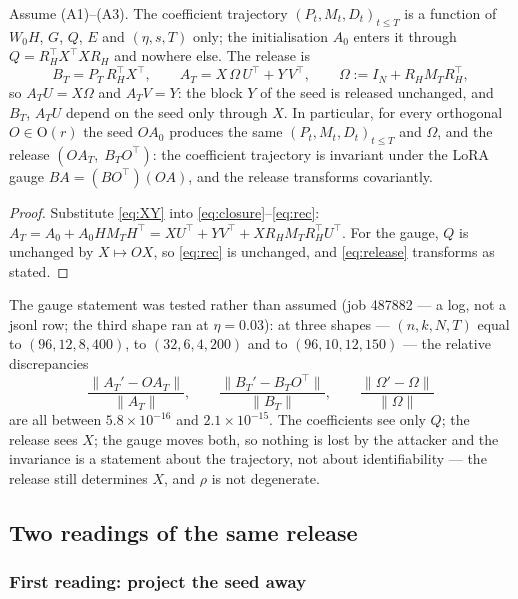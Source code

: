 \begin{corollary}\label{cor:seed}
Assume (A1)--(A3). The coefficient trajectory $(P_t,M_t,D_t)_{t\le T}$ is a
function of $W_0H$, $G$, $Q$, $E$ and $(\eta,s,T)$ only; the initialisation
$A_0$ enters it through $Q=R_H^{\!\top}X^{\!\top}XR_H$ and nowhere else. The release is
\begin{equation}\label{eq:release}
  B_T=P_T\,R_H^{\!\top}X^{\!\top},\qquad
  A_T=X\,\Omega\,U^{\!\top}+Y\,V^{\!\top},\qquad
  \Omega:=I_N+R_HM_TR_H^{\!\top},
\end{equation}
so $A_TU=X\Omega$ and $A_TV=Y$: the block $Y$ of the seed is released
unchanged, and $B_T$, $A_TU$ depend on the seed only through $X$. In
particular, for every orthogonal $O\in\mathrm O(r)$ the seed $OA_0$ produces
the same $(P_t,M_t,D_t)_{t\le T}$ and $\Omega$, and the release
$(OA_T,\;B_TO^{\!\top})$: the coefficient trajectory is invariant under the
LoRA gauge $BA=(BO^{\!\top})(OA)$, and the release transforms covariantly.
\end{corollary}
\begin{proof}
Substitute \eqref{eq:XY} into \eqref{eq:closure}--\eqref{eq:rec}:
$A_T=A_0+A_0HM_TH^{\!\top}=XU^{\!\top}+YV^{\!\top}+XR_HM_TR_H^{\!\top}U^{\!\top}$.
For the gauge, $Q$ is unchanged by $X\mapsto OX$, so \eqref{eq:rec} is
unchanged, and \eqref{eq:release} transforms as stated.
\end{proof}
The gauge statement was tested rather than assumed (job 487882 — a log,
not a jsonl row; the third shape ran at $\eta=0.03$):
at three shapes — $(n,k,N,T)$ equal to $(96,12,8,400)$, to $(32,6,4,200)$
and to $(96,10,12,150)$ — the relative discrepancies
\[
  \frac{\|A_T'-OA_T\|}{\|A_T\|},\qquad \frac{\|B_T'-B_TO^{\!\top}\|}{\|B_T\|},\qquad
  \frac{\|\Omega'-\Omega\|}{\|\Omega\|}
\]
are all between $5.8\times10^{-16}$ and $2.1\times10^{-15}$. The coefficients see only $Q$; the release sees $X$; the
gauge moves both, so nothing is lost by the attacker and the invariance is a
statement about the trajectory, not about identifiability — the release
still determines $X$, and $\rho$ is not degenerate.

\subsection{Two readings of the same release}
\label{sec:read}

\subsubsection*{First reading: project the seed away}

